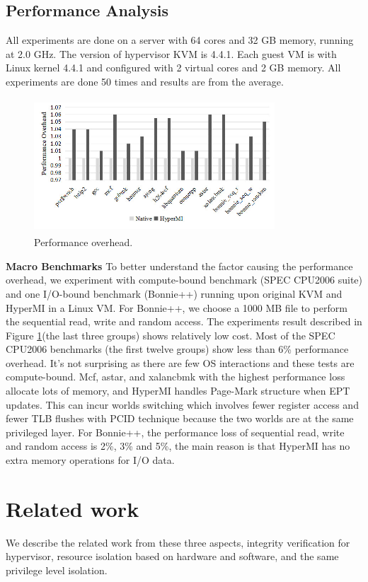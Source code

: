 \documentclass[conference]{IEEEtran}
\begin{document}
\subsection{Performance Analysis}

All experiments are done on a server with 64 cores and 32 GB memory, running at 2.0 GHz. The version of hypervisor KVM is 4.4.1. Each guest VM is with Linux kernel 4.4.1 and configured with 2 virtual cores and 2 GB memory. All experiments are done 50 times and results are from the average.

\begin{figure}
\centerline{\includegraphics[width=9cm,height=5cm]{VMSM51.jpg}}
\caption{Performance overhead.} \label{fig5}
\end{figure}

\textbf{Macro Benchmarks}
To better understand the factor causing the performance overhead, we experiment with compute-bound benchmark (SPEC CPU2006 suite) and one I/O-bound benchmark (Bonnie++) running upon original KVM and HyperMI in a Linux VM. For Bonnie++, we choose a 1000 MB file to perform the sequential read, write and random access. The experiments result described in Figure \ref{fig5}(the last three groups) shows relatively low cost. Most of the SPEC CPU2006 benchmarks (the first twelve groups) show less than 6\% performance overhead. It's not surprising as there are few OS interactions and these tests are compute-bound. Mcf, astar, and xalancbmk with the highest performance loss allocate lots of memory, and HyperMI handles Page-Mark structure when EPT updates. This can incur worlds switching which involves fewer register access and fewer TLB flushes with PCID technique because the two worlds are at the same privileged layer. For Bonnie++, the performance loss of sequential read, write and random access is 2\%, 3\% and 5\%, the main reason is that HyperMI has no extra memory operations for I/O data. 

\section{Related work}
We describe the related work from these three aspects, integrity verification for hypervisor, resource isolation based on hardware and software, and the same privilege level isolation.
\end{document}
